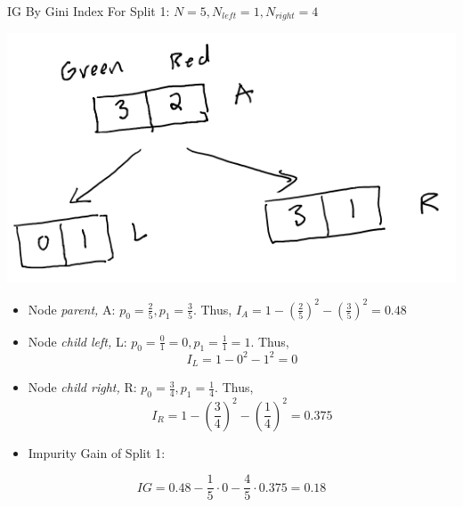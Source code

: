 \documentclass[
  ignorenonframetext,
]{beamer}
\begin{document}
\begin{frame}{IG By Gini Index}
\label{ig-by-gini-index}
For Split 1: \(N = 5, N_{left} =1, N_{right} = 4\)

\includegraphics{images/im1.png}

\begin{itemize}
\item
  Node \emph{parent,} A: \(p_0 = \frac{2}{5}, p_1 = \frac{3}{5}\). Thus,
  \(I_{A} = 1 - (\frac{2}{5})^2-(\frac{3}{5})^2 = 0.48\)
\item
  Node \emph{child left,} L:
  \(p_0 = \frac{0}{1} = 0, p_1 = \frac{1}{1} = 1\). Thus,
  \[I_{L} = 1 -0^2-1^2 = 0\]
\item
  Node \emph{child right,} R: \(p_0 = \frac{3}{4}, p_1 = \frac{1}{4}\).
  Thus, \[I_{R} = 1-(\frac{3}{4})^2-(\frac{1}{4})^2 = 0.375\]
\item
  Impurity Gain of Split 1:
\end{itemize}

\[IG = 0.48 - \frac{1}{5} \cdot 0-\frac{4}{5} \cdot 0.375 = 0.18\]
\end{frame}
\end{document}
